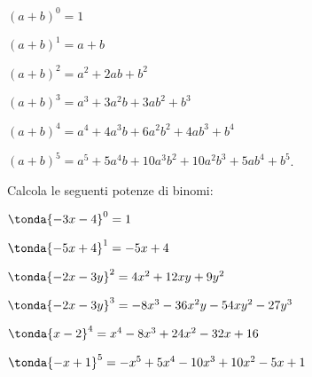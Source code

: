 \begin{itemize*}
\item \((a+b)^{0}=1\)
\item \((a+b)^{1}=a+b\)
\item \((a+b)^{2}=a^{2}+2{ab}+b^{2}\)
\item \((a+b)^{3}=a^{3}+3a^{2}b+3{ab}^{2}+b^{3}\)
\item \((a+b)^{4}=a^{4}+4a^{3}b+6a^{2}b^{2}+4{ab}^{3}+b^{4}\)
\item \((a+b)^{5}=a^{5}+5a^{4}b+10a^{3}b^{2}+10a^{2}b^{3}+5{ab}^{4}+b^{5}\).
\end{itemize*}

\begin{esempio} Calcola le seguenti potenze di binomi:
\begin{enumeratea}
\item \(\tonda{-3x-4}^0  = 1\)
\item \(\tonda{-5x+4}^1  = -5x+4\)
\item \(\tonda{-2x-3y}^2 = 4x^2+12xy+9y^2\)
\item \(\tonda{-2x-3y}^3 = -8x^3-36x^2y-54xy^2-27y^3\)
\item \(\tonda{x-2}^4    = x^4 -8x^3+24x^2-32x+16\)
\item \(\tonda{-x+1}^5   = -x^5 +5x^4-10x^3+10x^2-5x+1\)
\end{enumeratea}
\end{esempio}



